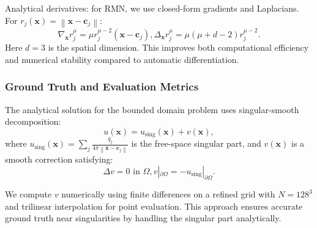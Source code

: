 \documentclass[twoside,11pt]{article}
\newcommand{\bx}{\bm{x}}
\newcommand{\bc}{\bm{c}}
\newcommand{\norm}[1]{\left\|#1\right\|}
\begin{document}
Analytical derivatives: for RMN, we use closed-form gradients and Laplacians. For $r_j(\bx) = \norm{\bx - \bc_j}$:
\begin{equation}
	\nabla_{\bx} r_j^\mu = \mu r_j^{\mu-2} (\bx - \bc_j), \Delta_{\bx} r_j^\mu = \mu(\mu + d - 2) r_j^{\mu-2}.
\end{equation}
Here $d=3$ is the spatial dimension.
This improves both computational efficiency and numerical stability compared to automatic differentiation.

\subsubsection{Ground Truth and Evaluation Metrics}

The analytical solution for the bounded domain problem uses singular-smooth decomposition:
\begin{equation}
	u(\bx) = u_{\text{sing}}(\bx) + v(\bx),
\end{equation}
where $u_{\text{sing}}(\bx) = \sum_j \frac{q_j}{4\pi\norm{\bx - \bc_j}}$ is the free-space singular part, and $v(\bx)$ is a smooth correction satisfying:
\begin{equation}
	\Delta v = 0 \text{ in } \Omega, v|_{\partial\Omega} = -u_{\text{sing}}|_{\partial\Omega}.
\end{equation}

We compute $v$ numerically using finite differences on a refined grid with $N = 128^3$ and trilinear interpolation for point evaluation. This approach ensures accurate ground truth near singularities by handling the singular part analytically.
\end{document}
